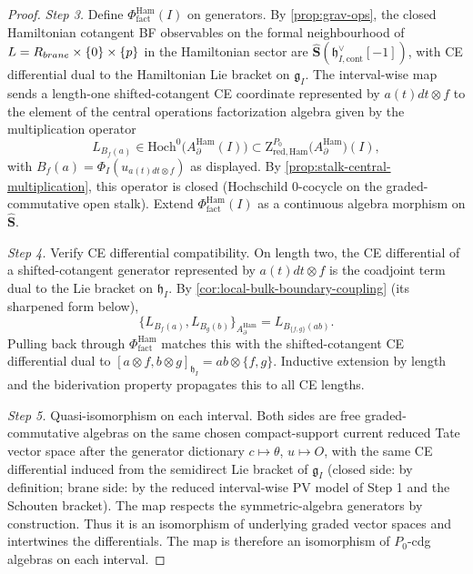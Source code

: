 \documentclass[11pt]{memoir}
\begin{document}
\begin{proof}
  \emph{Step 3.} Define $\Phi^{\mathrm{Ham}}_{\mathrm{fact}}(I)$ on
  generators. By \ref{prop:grav-ops}, the closed Hamiltonian
  cotangent BF observables on the formal neighbourhood of
  \(L=R_{brane}\times\{0\}\times\{p\}\) in the Hamiltonian sector are
  $\widehat{\mathbf S}(\mathfrak h^{\vee}_{I,\mathrm{cont}}[-1])$,
  with CE differential dual to the Hamiltonian Lie bracket on
  $\mathfrak g_I$. The interval-wise map sends a length-one
  shifted-cotangent CE coordinate represented by \(a(t)dt\otimes f\)
  to the element of the central operations factorization algebra given
  by the multiplication operator
  $$L_{B_f(a)}\in\mathrm{Hoch}^0\bigl(A_\partial^{\mathrm{Ham}}(I)\bigr)
    \subset\mathrm Z^{P_0}_{\mathrm{red,Ham}}\bigl(A_\partial^{\mathrm{Ham}}\bigr)(I),$$
  with \(B_f(a)=\Phi_I(u_{a(t)dt\otimes f})\) as displayed. By
  \ref{prop:stalk-central-multiplication}, this operator is closed
  (Hochschild $0$-cocycle on the graded-commutative open stalk).
  Extend $\Phi^{\mathrm{Ham}}_{\mathrm{fact}}(I)$ as a continuous
  algebra morphism on $\widehat{\mathbf S}$.

  \emph{Step 4.} Verify CE differential compatibility. On length two,
  the CE differential of a shifted-cotangent generator
  represented by \(a(t)dt\otimes f\) is the coadjoint term dual to the Lie bracket on
  $\mathfrak h_I$. By
  \ref{cor:local-bulk-boundary-coupling} (its sharpened form below),
  $$\{L_{B_f(a)},L_{B_g(b)}\}_{A_\partial^{\mathrm{Ham}}}
    =L_{B_{\{f,g\}}(ab)}.$$
  Pulling back through $\Phi^{\mathrm{Ham}}_{\mathrm{fact}}$ matches
  this with the shifted-cotangent CE differential dual to
  $[a\otimes f,b\otimes g]_{\mathfrak h_I}=ab\otimes\{f,g\}$.
  Inductive extension by length and the biderivation property
  propagates this to all CE lengths.

  \emph{Step 5.} Quasi-isomorphism on each interval. Both sides are
  free graded-commutative algebras on the same chosen compact-support
  current reduced Tate vector
  space after the generator dictionary
  $c\mapsto\theta$, $u\mapsto O$, with the same CE
  differential induced from the semidirect Lie bracket of $\mathfrak g_I$
	  (closed side: by definition; brane side: by the reduced
	  interval-wise PV model of Step 1 and the Schouten bracket). The map
  respects the symmetric-algebra generators by construction. Thus it
  is an isomorphism of underlying graded vector spaces and
  intertwines the differentials. The map is therefore an isomorphism
  of $P_0$-cdg algebras on each interval.


\end{proof}
\end{document}
